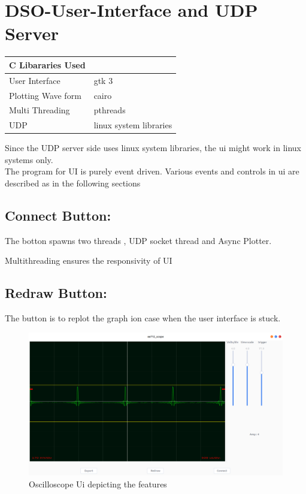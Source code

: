 \documentclass{article}
\begin{document}
	\section{DSO-User-Interface and UDP Server }
	\begin{center}
	\begin{tabular}{ll}

		\hline 
		C Libararies Used &  \\ 
		\hline 
		User Interface & gtk 3  \\ 
	 
		Plotting Wave form & cairo \\ 
	
		Multi Threading & pthreads \\ 
	
		UDP & linux system libraries \\ 
		\hline 
	\end{tabular} 
	\end{center}
	Since the UDP server side uses linux system libraries, the ui might work in linux systems only.\\
	The program for UI is purely event driven. Various events and controls in ui are described as in the following sections
	\subsection{Connect Button:} 
	The botton spawns two threads , UDP socket thread and Async Plotter.
	
	Multithreading ensures the responsivity of UI
	
	
	\subsection{Redraw Button:} 
	The button is to replot the graph ion case when the user interface is stuck.
	\begin{figure}
		\centering
		\includegraphics[width=1.2\linewidth]{"Screenshot from 2019-05-06 16-06-52"}
		\caption[ee712_Scope]{Oscilloscope Ui depicting the features}
		\label{fig:screenshot-from-2019-05-06-16-06-52}
	\end{figure}
\end{document}
